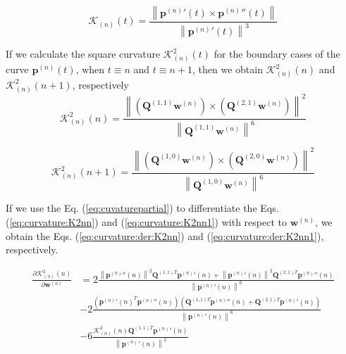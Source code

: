 \begin{equation}
\mathcal{K}_{(n)}(t)
=
\frac{\left\|{\mathbf{p}^{(n)}}'(t) \times {\mathbf{p}^{(n)}}''(t) \right\|}
{\left\|{\mathbf{p}^{(n)}}'(t)\right\|^{3}}
\end{equation}

If we calculate the square curvature $\mathcal{K}_{(n)}^{2}(t)$ for the boundary cases of the curve $\mathbf{p}^{(n)}(t)$, 
when $t\equiv n$ and $t\equiv n+1$,
then we obtain $\mathcal{K}_{(n)}^{2}(n)$ and $\mathcal{K}_{(n)}^{2}(n+1)$, respectively
\begin{equation}\label{eq:curvature:K2nn}
\mathcal{K}_{(n)}^{2}(n)
=
\frac{\left\|
\left( \mathbf{Q}^{(1,1)} \mathbf{w}^{(n)} \right)
\times 
\left( \mathbf{Q}^{(2,1)} \mathbf{w}^{(n)} \right)
\right\|^{2}}
{\left\| \mathbf{Q}^{(1,1)} \mathbf{w}^{(n)} \right\|^{6}}
\end{equation}

\begin{equation}\label{eq:curvature:K2nn1}
\mathcal{K}_{(n)}^{2}(n+1)
=
\frac{\left\|
\left( \mathbf{Q}^{(1,0)} \mathbf{w}^{(n)} \right)
\times 
\left( \mathbf{Q}^{(2,0)} \mathbf{w}^{(n)} \right)
\right\|^{2}}
{\left\| \mathbf{Q}^{(1,0)} \mathbf{w}^{(n)} \right\|^{6}}
\end{equation}


If we use the Eq. (\ref{eq:cuvaturepartial}) to differentiate the Eqs. (\ref{eq:curvature:K2nn}) and (\ref{eq:curvature:K2nn1})
with respect to $\mathbf{w}^{(n)}$, 
we obtain the Eqs. (\ref{eq:curvature:der:K2nn}) and (\ref{eq:curvature:der:K2nn1}), respectively.

\begin{equation}\label{eq:curvature:der:K2nn}
\begin{split}
\frac{
\partial 
\mathcal{K}_{(n)}^{2}(n)
}
{
\partial \mathbf{w}^{(n)}
}
& = 
2
\frac{
\left\|{\mathbf{p}^{(n)}}''(n)\right\|^2
\mathbf{Q}^{(1,1)T} {\mathbf{p}^{(n)}}'(n)
+
\left\|{\mathbf{p}^{(n)}}'(n)\right\|^2
\mathbf{Q}^{(2,1)T} {\mathbf{p}^{(n)}}''(n)
}
{\left\| {\mathbf{p}^{(n)}}'(n) \right\|^{6}}\\[10pt]
& - 
2
\frac
{
\left(
{{\mathbf{p}^{(n)}}'(n)}^{T}
{\mathbf{p}^{(n)}}''(n)
\right)
\left(
\mathbf{Q}^{(1,1)T}{\mathbf{p}^{(n)}}''(n)
+
\mathbf{Q}^{(2,1)T}{\mathbf{p}^{(n)}}'(n)
\right)
}
{\left\| {\mathbf{p}^{(n)}}'(n) \right\|^{6}}\\[10pt]
& - 
6
\frac
{
\mathcal{K}_{(n)}^{2}(n)
\mathbf{Q}^{(1,1)T}{\mathbf{p}^{(n)}}'(n)
}
{\left\| {\mathbf{p}^{(n)}}'(n) \right\|^{2}}
\end{split}
\end{equation}

